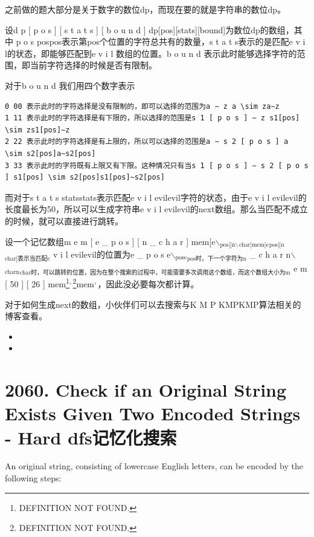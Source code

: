 \documentclass[9pt, b5paaper]{book}
\begin{document}
之前做的题大部分是关于数字的数位dp，而现在要的就是字符串的数位dp。

设d p [ p o s ] [ s t a t s ] [ b o u n d ] dp[pos][stats][bound]为数位dp的数组，其中 p o s pospos表示第pos个位置的字符总共有的数量，s t a t s表示的是匹配e v i l的状态，即能够匹配到e v i l 数组的位置。b o u n d 表示此时能够选择字符的范围，即当前字符选择的时候是否有限制。

对于b o u n d 我们用四个数字表示
\begin{verbatim}
0 00 表示此时的字符选择是没有限制的，即可以选择的范围为a ∼ z a \sim za∼z
1 11 表示此时的字符选择是有下限的，所以选择的范围是s 1 [ p o s ] ∼ z s1[pos] \sim zs1[pos]∼z
2 22 表示此时的字符选择是有上限的，所以可以选择的范围是a ∼ s 2 [ p o s ] a \sim s2[pos]a∼s2[pos]
3 33 表示此时的字符既有上限又有下限。这种情况只有当s 1 [ p o s ] ∼ s 2 [ p o s ] s1[pos] \sim s2[pos]s1[pos]∼s2[pos]
\end{verbatim}

而对于s t a t s statsstats表示匹配e v i l evilevil字符的状态，由于e v i l evilevil的长度最长为50，所以可以生成字符串e v i l evilevil的next数组。那么当匹配不成立的时候，就可以直接进行跳转。

设一个记忆数组m e m [ e \_ p o s ] [ n \_ c h a r ] mem[e$\backslash$$_{\text{pos][n$\backslash$}}$$_{\text{char]mem[e}}$$_{\text{pos][n}}$$_{\text{char]表示当匹配e}}$ v i l evilevil的位置为e \_ p o s e$\backslash$$_{\text{pose}}$$_{\text{pos时，下一个字符为n}}$ \_ c h a r n$\backslash$$_{\text{charn}}$$_{\text{char时，可以跳转的位置，因为在整个搜索的过程中，可能需要多次调用这个数组，而这个数组大小为m}}$ e m [ 50 ] [ 26 ] mem\footnote{DEFINITION NOT FOUND.}\textsuperscript{,}\,\footnote{DEFINITION NOT FOUND.}mem\footnotemark[7]{}\textsuperscript{,}\,\footnotemark[8]{}，因此没必要每次都计算。

对于如何生成next的数组，小伙伴们可以去搜索与K M P KMPKMP算法相关的博客查看。

\begin{itemize}
\item 
\item 
\end{itemize}

\section{2060. Check if an Original String Exists Given Two Encoded Strings - Hard dfs记忆化搜索}
\label{sec-15-4}
An original string, consisting of lowercase English letters, can be encoded by the following steps:
\end{document}

